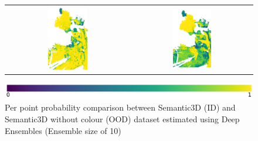 \begin{figure}[h!]
\begin{tabular}{cc}
            \includegraphics[width=0.33\textwidth, height=0.18\textheight]{images/ood_imgs/de_sem3d/de_prob_10_3.pdf}&
            \includegraphics[width=0.33\textwidth, height=0.18\textheight]{images/sem3d_of/de_prob_sem3d_of_3.pdf}\\
        \end{tabular}
        \includegraphics[scale=0.45]{images/prob_legend.pdf}
        \caption{Per point probability comparison between Semantic3D (ID) and Semantic3D without colour (OOD) dataset estimated using Deep Ensembles (Ensemble size of 10)}
        \label{fig:de_probmap_vis_sem3d_OF}
    \end{figure}
